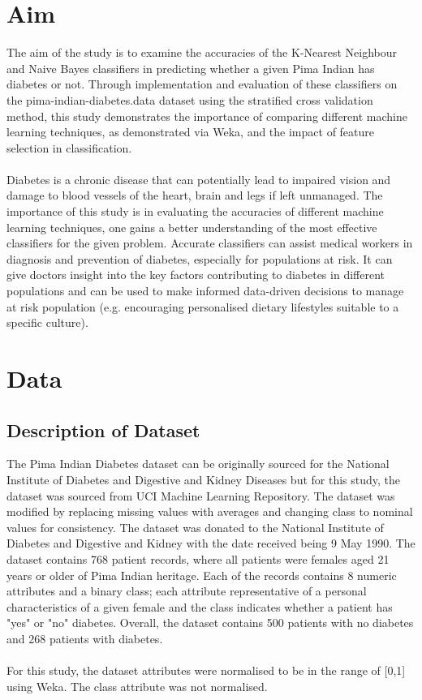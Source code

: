 \documentclass{article}
\begin{document}
    

    \tableofcontents{}
    \newpage
    \section{Aim}
    The aim of the study is to examine the accuracies of the K-Nearest Neighbour and Naive Bayes classifiers in predicting whether a given Pima Indian has diabetes or not. Through implementation and evaluation of these classifiers on the pima-indian-diabetes.data dataset using the stratified cross validation method, this study demonstrates the importance of comparing different machine learning techniques, as demonstrated via Weka, and the impact of feature selection in classification.
    \\
    \\
    Diabetes is a chronic disease that can potentially lead to impaired vision and damage to blood vessels of the heart, brain and legs if left unmanaged. The importance of this study is in evaluating the accuracies of different machine learning techniques, one gains a better understanding of the most effective classifiers for the given problem. Accurate classifiers can assist medical workers in diagnosis and prevention of diabetes, especially for populations at risk. It can give doctors insight into the key factors contributing to diabetes in different populations and can be used to make informed data-driven decisions to manage at risk population (e.g. encouraging personalised dietary lifestyles suitable to a specific culture). 

    \section{Data}
    \subsection{Description of Dataset}
    The Pima Indian Diabetes dataset can be originally sourced for the National Institute of Diabetes and Digestive and Kidney Diseases but for this study, the dataset was sourced from UCI Machine Learning Repository. The dataset was modified by replacing missing values with averages and changing class to nominal values for consistency. The dataset was donated to the National Institute of Diabetes and Digestive and Kidney with the date received being 9 May 1990.  The dataset contains 768 patient records, where all patients were females aged 21 years or older of Pima Indian heritage. Each of the records contains 8 numeric attributes and a binary class; each attribute representative of a personal characteristics of a given female and the class indicates whether a patient has "yes" or "no" diabetes. Overall, the dataset contains 500 patients with no diabetes and 268 patients with diabetes.
    \\
    \\
    For this study, the dataset attributes were normalised to be in the range of [0,1] using Weka. The class attribute was not normalised.
\end{document}
